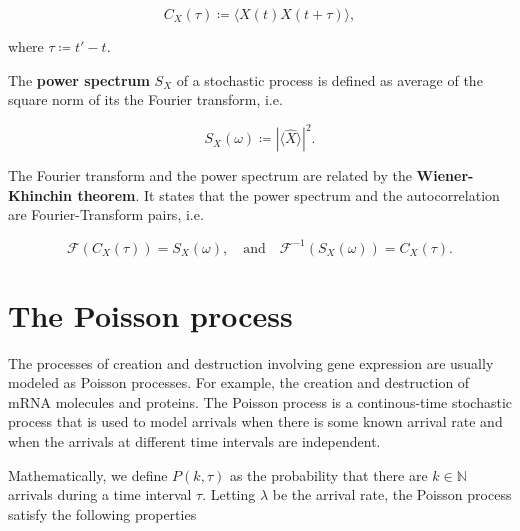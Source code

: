 \begin{equation*}
  C_X(\tau) \coloneqq \langle X(t)X(t+\tau)\rangle,
\end{equation*}

where $\tau \coloneqq t'-t$.

The \textbf{power spectrum} $S_X$ of a stochastic process is defined as average of the square norm of its the Fourier transform, i.e.

\begin{equation*}
  S_X(\omega) \coloneqq \left|\langle\hat X\rangle\right|^2.
\end{equation*}

The Fourier transform and the power spectrum are related by the \textbf{Wiener-Khinchin theorem}. It states that the power spectrum and the autocorrelation are Fourier-Transform pairs, i.e.

\begin{equation*}
  \mathscr{F}(C_X(\tau)) = S_X(\omega),\quad\text{and}\quad \mathscr{F}^{-1}(S_X(\omega)) = C_X(\tau).
\end{equation*}

\section{The Poisson process}
\label{sec:poisson}

The processes of creation and destruction involving gene expression are usually modeled as Poisson processes. For example, the creation and destruction of mRNA molecules and proteins. The Poisson process is a continous-time stochastic process that is used to model arrivals when there is some known arrival rate and when the arrivals at different time intervals are independent.

Mathematically, we define $P(k,\tau)$ as the probability that there are $k\in\mathbb{N}$ arrivals during a time interval $\tau$. Letting $\lambda$ be the arrival rate, the Poisson process satisfy the following properties

